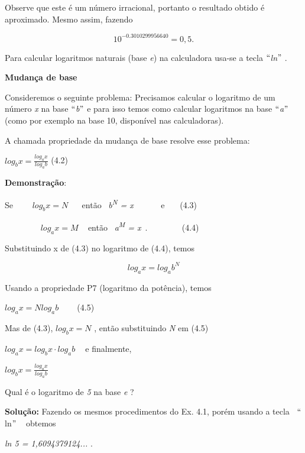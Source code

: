 Observe que este é um número irracional, portanto o resultado obtido é aproximado. Mesmo assim, fazendo 

\[ 10^{- 0.3010299956640}=0,5.  \] 

Para calcular logaritmos naturais (base \textit{e}) na calculadora usa-se a tecla $``$\textit{ln}$"$ .

\textbf{Mudança de base}

Consideremos o seguinte problema: Precisamos calcular o logaritmo de um número \textit{x} na base $``$\textit{b}$"$  e para isso temos como calcular logaritmos na base $``$\textit{a}$"$  (como por exemplo na base 10, disponível nas calculadoras).

A chamada propriedade da mudança de base resolve esse problema:

\begin{FlushRight}
 \( log_{b}x=\frac{log_{a}x}{log_{a}b} \) \quad \quad \quad \quad \quad \quad \quad (4.2)
\end{FlushRight}

\textbf{Demonstração}:

Se~~~~  \( log_{b}x=N \) ~~ então~ \textit{b\textsuperscript{N} = x}~~~~~~ e\quad \quad \quad \quad \quad ~~~ (4.3)

~~~~~~~~  \( log_{a}x=M \) ~ então~ \textit{a\textsuperscript{M} = x}~.~~~~  \quad \quad \quad \quad \quad ~~~ (4.4)

Substituindo x de (4.3) no logaritmo de (4.4), temos

 \[ log_{a}x=log_{a}b^{N} \] 

Usando a propriedade P7 (logaritmo da potência), temos

\quad \quad  \( log_{a}x=Nlog_{a}b^{} \) \quad \quad \quad \quad \quad \quad \quad ~~~ (4.5)

Mas de (4.3),  \( log_{b}x=N \) , então substituindo \textit{N} em (4.5)

\quad \quad  \( log_{a}x=log_{b}x  \cdot  log_{a}b^{} \) ~ e finalmente,

\quad \quad  \( log_{b}x=\frac{log_{a}x}{log_{a}b} \)  \qedsymbol{}

\begin{texemplo}
    Qual é o logaritmo de \textit{5} na base \textit{e} ? 

    \textbf{Solução: }Fazendo os mesmos procedimentos do Ex. 4.1, porém usando a tecla~ $``$ln$"$ ~ obtemos 

    \textit{ ln 5 = 1,6094379124...} . \qedsymbol{}
    
\end{texemplo}

